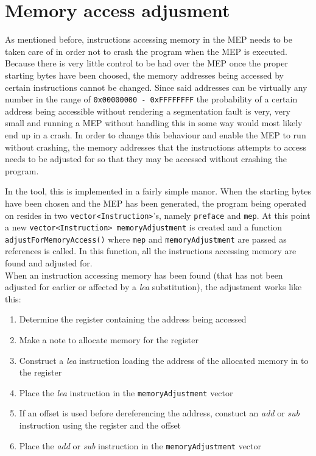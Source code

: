\documentclass[11pt,twoside]{eitExjobb}
\begin{document}
\section{Memory access adjusment}
As mentioned before, instructions accessing memory in the MEP needs to be taken care of in order not to crash the program when the MEP is executed. Because there is very little control to be had over the MEP once the proper starting bytes have been choosed, the memory addresses being accessed by certain instructions cannot be changed. Since said addresses can be virtually any number in the range of \texttt{0x00000000 - 0xFFFFFFFF} the probability of a certain address being accessible without rendering a segmentation fault is very, very small and running a MEP without handling this in some way would most likely end up in a crash.  In order to change this behaviour and enable the MEP to run without crashing, the memory addresses that the instructions attempts to access needs to be adjusted for so that they may be accessed without crashing the program. 

In the tool, this is implemented in a fairly simple manor. When the starting bytes have been chosen and the MEP has been generated, the program being operated on resides in two \texttt{vector<Instruction>}'s, namely \texttt{preface} and \texttt{mep}. At this point a new \texttt{vector<Instruction> memoryAdjustment} is created and a function \texttt{adjustForMemoryAccess()} where \texttt{mep} and \texttt{memoryAdjustment} are passed as references is called. In this function, all the instructions accessing memory are found and adjusted for.\\

\noindent When an instruction accessing memory has been found (that has not been adjusted for earlier or affected by a \emph{lea} substitution), the adjustment works like this:
\begin{enumerate}
\item{Determine the register containing the address being accessed}
\item{Make a note to allocate memory for the register}
\item{Construct a \emph{lea} instruction loading the address of the allocated memory in to the register}
\item{Place the \emph{lea} instruction in the \texttt{memoryAdjustment} vector}
\item{If an offset is used before dereferencing the address, constuct an \emph{add} or \emph{sub} instruction using the register and the offset}
\item{Place the \emph{add} or \emph{sub} instruction in the \texttt{memoryAdjustment} vector}
\end{enumerate} 
\end{document}
